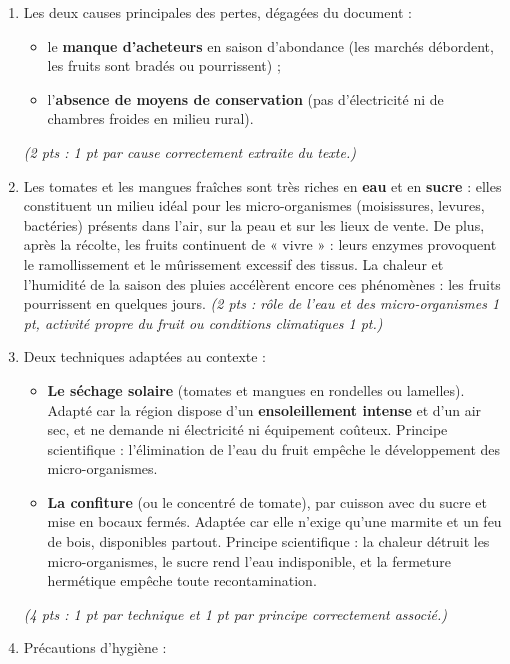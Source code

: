 \documentclass[11pt]{article}
\begin{document}
\begin{corrige}
\begin{enumerate}
\item Les deux causes principales des pertes, dégagées du document :
\begin{itemize}
\item le \textbf{manque d'acheteurs} en saison d'abondance (les marchés débordent, les fruits sont bradés ou pourrissent) ;
\item l'\textbf{absence de moyens de conservation} (pas d'électricité ni de chambres froides en milieu rural).
\end{itemize}
\emph{(2 pts : 1 pt par cause correctement extraite du texte.)}
\item Les tomates et les mangues fraîches sont très riches en \textbf{eau} et en \textbf{sucre} : elles constituent un milieu idéal pour les micro-organismes (moisissures, levures, bactéries) présents dans l'air, sur la peau et sur les lieux de vente. De plus, après la récolte, les fruits continuent de « vivre » : leurs enzymes provoquent le ramollissement et le mûrissement excessif des tissus. La chaleur et l'humidité de la saison des pluies accélèrent encore ces phénomènes : les fruits pourrissent en quelques jours. \emph{(2 pts : rôle de l'eau et des micro-organismes 1 pt, activité propre du fruit ou conditions climatiques 1 pt.)}
\item Deux techniques adaptées au contexte :
\begin{itemize}
\item \textbf{Le séchage solaire} (tomates et mangues en rondelles ou lamelles). Adapté car la région dispose d'un \textbf{ensoleillement intense} et d'un air sec, et ne demande ni électricité ni équipement coûteux. Principe scientifique : l'élimination de l'eau du fruit empêche le développement des micro-organismes.
\item \textbf{La confiture} (ou le concentré de tomate), par cuisson avec du sucre et mise en bocaux fermés. Adaptée car elle n'exige qu'une marmite et un feu de bois, disponibles partout. Principe scientifique : la chaleur détruit les micro-organismes, le sucre rend l'eau indisponible, et la fermeture hermétique empêche toute recontamination.
\end{itemize}
\emph{(4 pts : 1 pt par technique et 1 pt par principe correctement associé.)}
\item Précautions d'hygiène :
\begin{itemize}

\end{itemize}
\end{enumerate}
\end{corrige}
\end{document}
